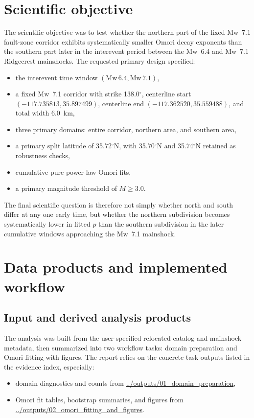 \documentclass[11pt]{article}
\begin{document}
\section{Scientific objective}
The scientific objective was to test whether the northern part of the fixed Mw~7.1 fault-zone corridor exhibits systematically smaller Omori decay exponents than the southern part later in the interevent period between the Mw~6.4 and Mw~7.1 Ridgecrest mainshocks. The requested primary design specified:
\begin{itemize}[leftmargin=2em]
    \item the interevent time window $(\mathrm{Mw}\,6.4,\mathrm{Mw}\,7.1)$,
    \item a fixed Mw~7.1 corridor with strike 138.0$^{\circ}$, centerline start $(-117.735813,35.897499)$, centerline end $(-117.362520,35.559488)$, and total width 6.0~km,
    \item three primary domains: entire corridor, northern area, and southern area,
    \item a primary split latitude of 35.72$^{\circ}$N, with 35.70$^{\circ}$N and 35.74$^{\circ}$N retained as robustness checks,
    \item cumulative pure power-law Omori fits,
    \item a primary magnitude threshold of $M \geq 3.0$.
\end{itemize}
The final scientific question is therefore not simply whether north and south differ at any one early time, but whether the northern subdivision becomes systematically lower in fitted $p$ than the southern subdivision in the later cumulative windows approaching the Mw~7.1 mainshock.

\section{Data products and implemented workflow}
\subsection{Input and derived analysis products}
The analysis was built from the user-specified relocated catalog and mainshock metadata, then summarized into two workflow tasks: domain preparation and Omori fitting with figures. The report relies on the concrete task outputs listed in the evidence index, especially:
\begin{itemize}[leftmargin=2em]
    \item domain diagnostics and counts from
    \url{../outputs/01_domain_preparation},
    \item Omori fit tables, bootstrap summaries, and figures from
    \url{../outputs/02_omori_fitting_and_figures}.
\end{itemize}
\end{document}
